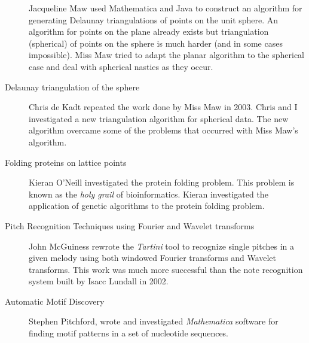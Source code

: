 \begin{description}
          Jacqueline Maw used Mathematica and Java to construct an
          algorithm for generating Delaunay triangulations of points on
          the unit sphere. An algorithm for points on the plane already
          exists but triangulation (spherical) of points on the sphere
          is much harder (and in some cases impossible).
          Miss Maw tried to adapt the planar algorithm to the
          spherical case and deal with spherical nasties as they occur.
\item[ Delaunay triangulation of the sphere]
           Chris de Kadt repeated the work done by Miss Maw in 2003.
          Chris and I investigated a new triangulation algorithm
          for spherical data. The new algorithm overcame 
          some of the problems that occurred with Miss Maw's algorithm.
\item[ Folding proteins on lattice points]
           Kieran O'Neill investigated the protein folding problem.
          This problem is known as the {\em holy grail} of bioinformatics.
          Kieran investigated the application of genetic algorithms to
          the protein folding problem. 
\item[ Pitch Recognition Techniques using Fourier and Wavelet transforms]
          John McGuiness rewrote the {\em Tartini} tool
          to recognize single pitches in a given melody using both
          windowed Fourier transforms and Wavelet transforms. This
          work was much more successful than the note recognition system
          built by Isacc Lundall in 2002.
\item[ Automatic Motif Discovery]
    Stephen Pitchford, wrote and investigated {\em Mathematica} software for
    finding motif patterns in a set of nucleotide sequences.
\end{description}
\newpage
\label{f0}
